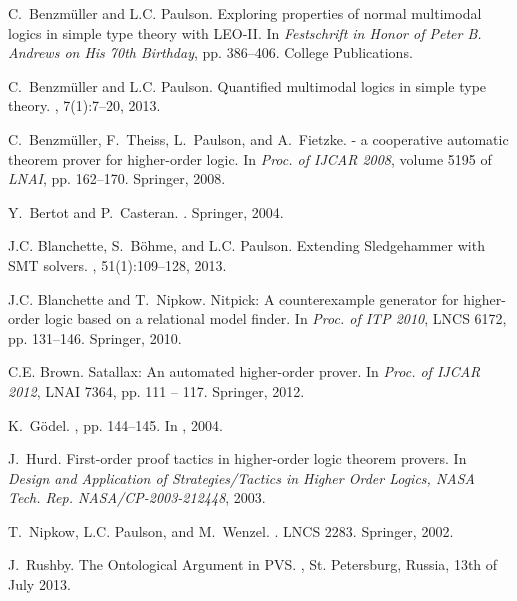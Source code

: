\documentclass[11pt,a4paper]{article}
\begin{document}
\begin{thebibliography}{10}

C.~Benzm{\"u}ller and L.C. Paulson.
\newblock Exploring properties of normal multimodal logics in simple type
  theory with {LEO-II}.
\newblock In {\em {Festschrift in Honor of {Peter B. Andrews} on His 70th
  Birthday}}, pp. 386--406. College Publications.

C.~Benzm{\"u}ller and L.C. Paulson.
\newblock Quantified multimodal logics in simple type theory.
,
  7(1):7--20, 2013.

C.~Benzm{\"u}ller, F.~Theiss, L.~Paulson, and A.~Fietzke.
 - a cooperative automatic theorem prover for higher-order
  logic.
\newblock In {\em Proc. of IJCAR 2008}, volume 5195 of {\em LNAI}, pp.
  162--170. Springer, 2008.

Y.~Bertot and P.~Casteran.
.
\newblock Springer, 2004.

J.C. Blanchette, S.~B\"ohme, and L.C. Paulson.
\newblock Extending {Sledgehammer} with {SMT} solvers.
, 51(1):109--128, 2013.

J.C. Blanchette and T.~Nipkow.
\newblock Nitpick: A counterexample generator for higher-order logic based on a
  relational model finder.
\newblock In {\em Proc. of ITP 2010}, LNCS 6172, pp. 131--146.
  Springer, 2010.

C.E. Brown.
\newblock Satallax: An automated higher-order prover.
\newblock In {\em Proc. of IJCAR 2012}, LNAI 7364, pp. 111 -- 117.
  Springer, 2012.

K.~G\"odel.
, pp. 144--145.
\newblock In  \cite{sobel2004logic}, 2004.


J.~Hurd.
\newblock First-order proof tactics in higher-order logic theorem provers.
\newblock In {\em Design and Application of Strategies/Tactics in Higher Order
  Logics, NASA Tech. Rep. NASA/CP-2003-212448}, 2003.

T.~Nipkow, L.C. Paulson, and M.~Wenzel.
.
\newblock LNCS 2283. Springer, 2002.

J.~Rushby.
\newblock The Ontological Argument in PVS. 
, St. Petersburg, Russia, 13th of July 2013.


\end{thebibliography}
\end{document}
